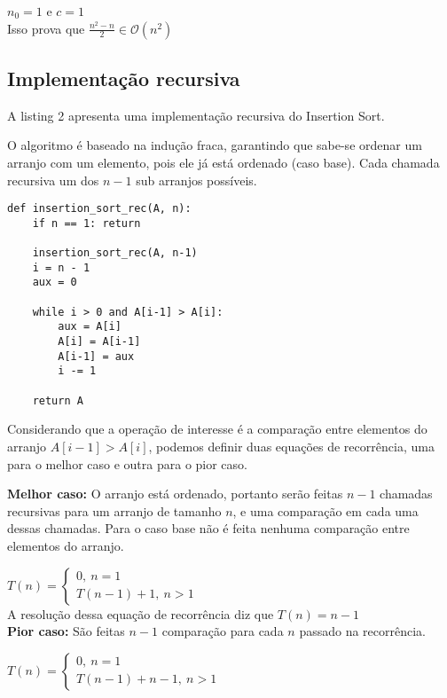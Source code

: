 \documentclass[a4paper, twocolumn]{article}
\theoremstyle{definition}
\begin{document}
$n_0 = 1$ e $c = 1$ \\

Isso prova que $\frac{n^2-n}{2} \in \mathcal{O}(n^2)$

\subsection{Implementação recursiva}	

A listing 2 apresenta uma implementação recursiva do Insertion Sort.

O algoritmo é baseado na indução fraca, garantindo que sabe-se ordenar um arranjo com um elemento, pois ele já está ordenado (caso base). Cada chamada recursiva um dos $n-1$ sub arranjos possíveis.

\begin{lstlisting}[label=insertion_sort_rec,caption= Insertion Sort recursivo]
def insertion_sort_rec(A, n):
    if n == 1: return 

    insertion_sort_rec(A, n-1)
    i = n - 1
    aux = 0

    while i > 0 and A[i-1] > A[i]:
        aux = A[i]
        A[i] = A[i-1]
        A[i-1] = aux
        i -= 1

    return A
\end{lstlisting}
	
Considerando que a operação de interesse é a comparação entre elementos do arranjo $A[i-1] > A[i]$, podemos definir duas equações de recorrência, uma para o melhor caso e outra para o pior caso.

\textbf{Melhor caso: } O arranjo está ordenado, portanto serão feitas $n-1$ chamadas recursivas para um arranjo de tamanho $n$, e uma comparação em cada uma dessas chamadas. Para o caso base não é feita nenhuma comparação entre elementos do arranjo.

$T(n) = \begin{cases} 
	0, \ n  = 1\\
	T(n-1) + 1, \ n > 1
\end{cases}$ \\

A resolução dessa equação de recorrência diz que $T(n) = n - 1$ \\

\textbf{Pior caso: } São feitas $n-1$ comparação para cada $n$ passado na recorrência.

$T(n) = \begin{cases} 
	0, \ n  = 1\\
	T(n-1) + n-1, \ n > 1
\end{cases}$ \\
\end{document}
